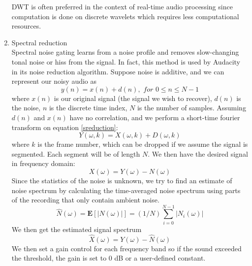 \begin{enumerate}
	DWT is often preferred in the context of real-time audio processing since computation is done on discrete wavelets which requires less computational resources.
	
	\item Spectral reduction\\
	Spectral noise gating learns from a noise profile and removes slow-changing tonal noise or hiss from the signal. In 
	fact, this method is used by Audacity in its noise reduction algorithm. 
	Suppose noise is additive, and we can represent our noisy audio as
	\[y(n) = x(n) + d(n), \textit{ for } 0 \leq n \leq N-1 \label{sreduction} \]
	where $x(n)$ is our original signal (the signal we wish to recover), $d(n)$ is the noise, $n$ is the discrete time index,
	$N$ is the number of samples. 
	Assuming $d(n)$ and $x(n)$ have no correlation, and we perform a short-time fourier transform on equation \ref{sreduction}:
	\[Y(\omega,k)= X(\omega,k) + D(\omega,k)\]
	where $k$ is the frame number, which can be dropped if we assume the signal is segmented. Each segment will be of
	length $N$. We then have the desired signal in frequency domain:
	\[X(\omega) = Y(\omega) - N(\omega)\]
	Since the statistics of the noise is unknown, we try to find an estimate of noise spectrum by calculating the time-averaged
	noise spectrum using parts of the recording that only contain ambient noise. 
	\[\hat{N}(\omega) = \textbf{E}[|N(\omega)|] = (1/N)\sum_{i=0}^{N-1}|N_i(\omega)|\]
	We then get the estimated signal spectrum
	\[\hat{X}(\omega) = Y(\omega) - \hat{N}(\omega)\]
	We then set a gain control for each frequency band so if the sound exceeded the threshold, the gain is set to 0 dB or a user-defined
	constant.
\end{enumerate}
